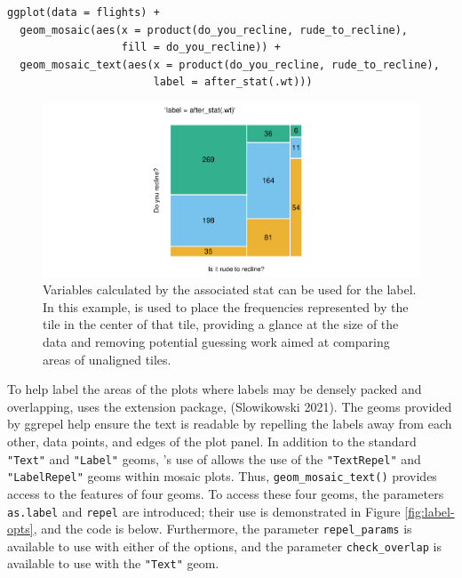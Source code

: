 \begin{verbatim}
ggplot(data = flights) +
  geom_mosaic(aes(x = product(do_you_recline, rude_to_recline), 
                  fill = do_you_recline)) +
  geom_mosaic_text(aes(x = product(do_you_recline, rude_to_recline), 
                       label = after_stat(.wt)))
\end{verbatim}

\begin{figure}

{\centering \includegraphics[width=1\linewidth]{jeppson-hofmann_files/figure-latex/labels2-1} 

}

\caption{Variables calculated by the associated stat can be used for the label. In this example,  is used to place the frequencies represented by the tile in the center of that tile, providing a glance at the size of the data and removing potential guessing work aimed at comparing areas of unaligned tiles.}\label{fig:labels2}
\end{figure}

To help label the areas of the plots where labels may be densely packed and overlapping,  uses the  extension package,  (Slowikowski 2021). The geoms provided by ggrepel help ensure the text is readable by repelling the labels away from each other, data points, and edges of the plot panel. In addition to the standard \texttt{"Text"} and \texttt{"Label"} geoms, 's use of  allows the use of the \texttt{"TextRepel"} and \texttt{"LabelRepel"} geoms within mosaic plots. Thus, \texttt{geom\_mosaic\_text()} provides access to the features of four geoms. To access these four geoms, the parameters \texttt{as.label} and \texttt{repel} are introduced; their use is demonstrated in Figure \ref{fig:label-opts}, and the code is below. Furthermore, the parameter \texttt{repel\_params} is available to use with either of the  options, and the parameter \texttt{check\_overlap} is available to use with the \texttt{"Text"} geom.

